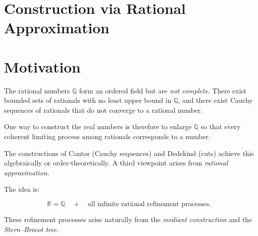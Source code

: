
\section{Construction via Rational Approximation}

\section*{Motivation}

\begin{exposition}
The rational numbers $\mathbb{Q}$ form an ordered field but are
\emph{not complete}. There exist bounded sets of rationals with no
least upper bound in $\mathbb{Q}$, and there exist Cauchy sequences
of rationals that do not converge to a rational number.
\end{exposition}

\begin{exposition}
One way to construct the real numbers is therefore to enlarge
$\mathbb{Q}$ so that every coherent limiting process among
rationals corresponds to a number.
\end{exposition}

\begin{exposition}
The constructions of Cantor (Cauchy sequences) and Dedekind
(cuts) achieve this algebraically or order-theoretically.
A third viewpoint arises from \emph{rational approximation}.
\end{exposition}

\begin{exposition}
The idea is:
\end{exposition}

\begin{exposition}
\[
\mathbb{R}
=
\mathbb{Q}
\quad+\quad
\text{all infinite rational refinement processes}.
\]
\end{exposition}

\begin{exposition}
These refinement processes arise naturally from the
\emph{mediant construction} and the \emph{Stern--Brocot tree}.
\end{exposition}

\begin{exposition}
\bigskip
\end{exposition}

